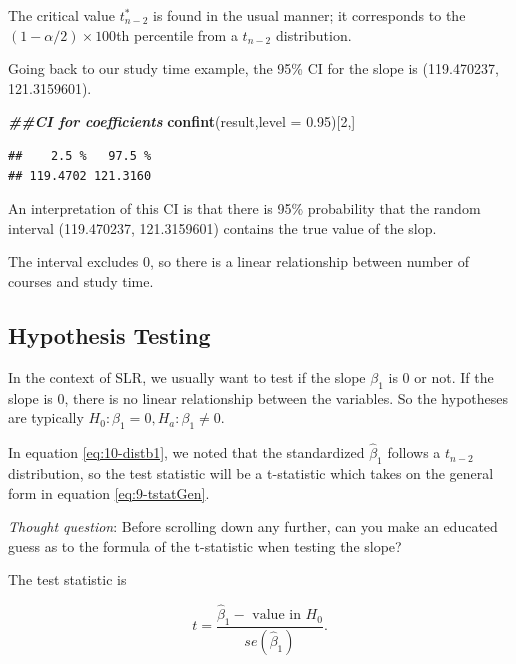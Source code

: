 \documentclass[
]{book}
\newenvironment{Shaded}{\begin{snugshade}}{\end{snugshade}}
\newcommand{\AttributeTok}[1]{\textcolor[rgb]{0.13,0.29,0.53}{#1}}
\newcommand{\DecValTok}[1]{\textcolor[rgb]{0.00,0.00,0.81}{#1}}
\newcommand{\DocumentationTok}[1]{\textcolor[rgb]{0.56,0.35,0.01}{\textbf{\textit{#1}}}}
\newcommand{\FloatTok}[1]{\textcolor[rgb]{0.00,0.00,0.81}{#1}}
\newcommand{\FunctionTok}[1]{\textcolor[rgb]{0.13,0.29,0.53}{\textbf{#1}}}
\newcommand{\NormalTok}[1]{#1}
\begin{document}
The critical value \(t_{n-2}^*\) is found in the usual manner; it corresponds to the \((1 - \alpha/2) \times 100\)th percentile from a \(t_{n-2}\) distribution.

Going back to our study time example, the 95\% CI for the slope is (119.470237, 121.3159601).

\begin{Shaded}
\begin{Highlighting}[]
\DocumentationTok{\#\#CI for coefficients}
\FunctionTok{confint}\NormalTok{(result,}\AttributeTok{level =} \FloatTok{0.95}\NormalTok{)[}\DecValTok{2}\NormalTok{,]}
\end{Highlighting}
\end{Shaded}

\begin{verbatim}
##    2.5 %   97.5 % 
## 119.4702 121.3160
\end{verbatim}

An interpretation of this CI is that there is 95\% probability that the random interval (119.470237, 121.3159601) contains the true value of the slop.

The interval excludes 0, so there is a linear relationship between number of courses and study time.

\hypertarget{hypothesis-testing-1}{%
\subsection{Hypothesis Testing}\label{hypothesis-testing-1}}

In the context of SLR, we usually want to test if the slope \(\beta_1\) is 0 or not. If the slope is 0, there is no linear relationship between the variables. So the hypotheses are typically \(H_0: \beta_1 = 0, H_a: \beta_1 \neq 0.\)

In equation \eqref{eq:10-distb1}, we noted that the standardized \(\hat{\beta}_1\) follows a \(t_{n-2}\) distribution, so the test statistic will be a t-statistic which takes on the general form in equation \eqref{eq:9-tstatGen}.

\emph{Thought question}: Before scrolling down any further, can you make an educated guess as to the formula of the t-statistic when testing the slope?

The test statistic is

\begin{equation} 
t = \frac{\hat{\beta}_1 - \text{ value in } H_0}{se(\hat{\beta}_1)}.
\label{eq:10-testslope}
\end{equation}
\end{document}
